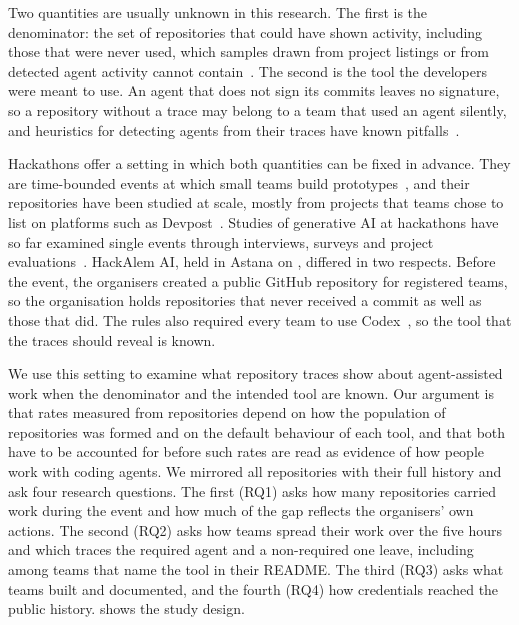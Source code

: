 \documentclass{article}
\begin{document}
Two quantities are usually unknown in this research. The first is the denominator: the set of repositories that could have shown activity, including those that were never used, which samples drawn from project listings or from detected agent activity cannot contain~\cite{kalliamvakou2014perils,baltes2022sampling}. The second is the tool the developers were meant to use. An agent that does not sign its commits leaves no signature, so a repository without a trace may belong to a team that used an agent silently, and heuristics for detecting agents from their traces have known pitfalls~\cite{robbes2026heuristics}.

Hackathons offer a setting in which both quantities can be fixed in advance. They are time-bounded events at which small teams build prototypes~\cite{chau2023hackathons}, and their repositories have been studied at scale, mostly from projects that teams chose to list on platforms such as Devpost~\cite{nolte2020hackathon,mcintosh2021hackathon,imam2021secretlife,mahmoud2022oneoff,halmans2026hackrep}. Studies of generative AI at hackathons have so far examined single events through interviews, surveys and project evaluations~\cite{zhou2026quickbuild,gama2025vibes,chen2026codeforall,sajja2024genaihack}. HackAlem AI, held in Astana on \eventdate, differed in two respects. Before the event, the organisers created a public GitHub repository for registered teams, so the organisation holds repositories that never received a commit as well as those that did. The rules also required every team to use Codex~\cite{hackalem2026site}, so the tool that the traces should reveal is known.

We use this setting to examine what repository traces show about agent-assisted work when the denominator and the intended tool are known. Our argument is that rates measured from repositories depend on how the population of repositories was formed and on the default behaviour of each tool, and that both have to be accounted for before such rates are read as evidence of how people work with coding agents. We mirrored all \NRqOneTotal{} repositories with their full history and ask four research questions. The first (RQ1) asks how many repositories carried work during the event and how much of the gap reflects the organisers' own actions. The second (RQ2) asks how teams spread their work over the five hours and which traces the required agent and a non-required one leave, including among teams that name the tool in their README. The third (RQ3) asks what teams built and documented, and the fourth (RQ4) how credentials reached the public history.  shows the study design.
\end{document}
